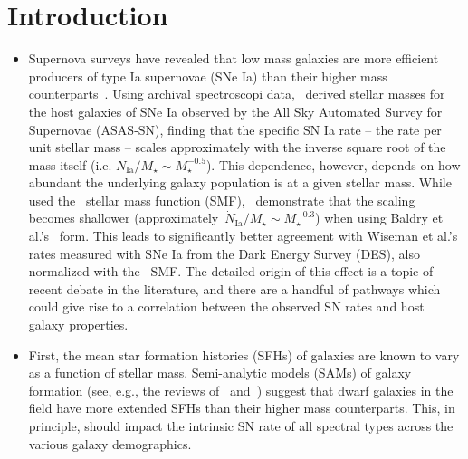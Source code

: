 \documentclass[ms.tex]{subfiles}
\begin{document}
\section{Introduction}
\label{sec:intro}

\begin{itemize}

	\item Supernova surveys have revealed that low mass galaxies are
	more efficient producers of type Ia supernovae (SNe Ia) than their higher
	mass counterparts~\citep[e.g.][]{Mannucci2005}.
	Using archival spectroscopi data,~\citet{Brown2019} derived stellar
	masses for the host galaxies of SNe Ia observed by the All Sky
	Automated Survey for Supernovae (ASAS-SN), finding that the specific SN
	Ia rate -- the rate per unit stellar mass -- scales approximately with
	the inverse square root of the mass itself (i.e.
	$\dot{N}_\text{Ia} / M_\star \sim M_\star^{-0.5}$).
	This dependence, however, depends on how abundant the underlying galaxy
	population is at a given stellar mass.
	While~\citet{Brown2019} used the~\citet{Bell2003} stellar mass function
	(SMF),~\citet{Gandhi2022} demonstrate that the scaling becomes shallower
	(approximately~$\dot{N}_\text{Ia} / M_\star \sim M_\star^{-0.3}$) when
	using Baldry et al.'s~\citeyearpar{Baldry2012} form.
	This leads to significantly better agreement with Wiseman et al.'s
	\citeyearpar{Wiseman2021} rates measured with SNe Ia from the Dark Energy
	Survey (DES), also normalized with the~\citet{Baldry2012} SMF.
	The detailed origin of this effect is a topic of recent debate in
	the literature, and there are a handful of pathways which could give rise
	to a correlation between the observed SN rates and host galaxy properties.

	\item First, the mean star formation histories (SFHs) of galaxies are known
	to vary as a function of stellar mass.
	Semi-analytic models (SAMs) of galaxy formation (see, e.g., the
	reviews of~\citealp{Baugh2006} and~\citealp*{Somerville2015a}) suggest that
	dwarf galaxies in the field have more extended SFHs than their higher mass
	counterparts.
	This, in principle, should impact the intrinsic SN rate of all spectral
	types across the various galaxy demographics.


\end{itemize}
\end{document}
